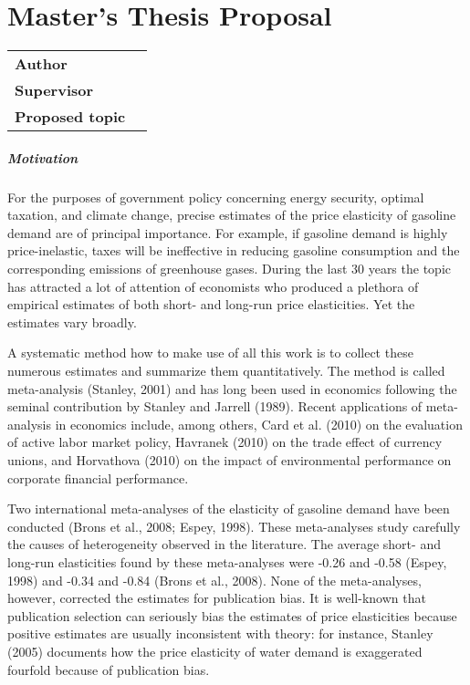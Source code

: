 \chapter*{Master's Thesis Proposal}

\begin{tabular}{lp{10.1cm}}
		\hline
		\textbf{Author} &{\AutorDP}\\
		\textbf{Supervisor} &{\Supervisor}\\
		\textbf{Proposed topic} &\Bookname\\
		\hline
\end{tabular}

\bigskip

\small
\paragraph{Motivation}

For the purposes of government policy concerning energy security, optimal taxation, and climate change, precise estimates of the price elasticity of gasoline demand are of principal importance. For example, if gasoline demand is highly price-inelastic, taxes will be ineffective in reducing gasoline consumption and the corresponding emissions of greenhouse gases. During the last 30 years the topic has attracted a lot of attention of economists who produced a plethora of empirical estimates of both short- and long-run price elasticities. Yet the estimates vary broadly.

A systematic method how to make use of all this work is to collect these numerous estimates and summarize them quantitatively. The method is called meta-analysis (Stanley, 2001) and has long been used in economics following the seminal contribution by Stanley and Jarrell (1989). Recent applications of meta-analysis in economics include, among others, Card et al. (2010) on the evaluation of active labor market policy, Havranek (2010) on the trade effect of currency unions, and Horvathova (2010) on the impact of environmental performance on corporate financial performance.

Two international meta-analyses of the elasticity of gasoline demand have been conducted (Brons et al., 2008; Espey, 1998). These meta-analyses study carefully the causes of heterogeneity observed in the literature. The average short- and long-run elasticities found by these meta-analyses were -0.26 and -0.58 (Espey, 1998) and
-0.34 and -0.84 (Brons et al., 2008). None of the meta-analyses, however, corrected the estimates for publication bias. It is well-known that publication selection can seriously bias the estimates of price elasticities because positive estimates are usually inconsistent with theory: for instance, Stanley (2005) documents how the price elasticity of water demand is exaggerated fourfold because of publication bias.

